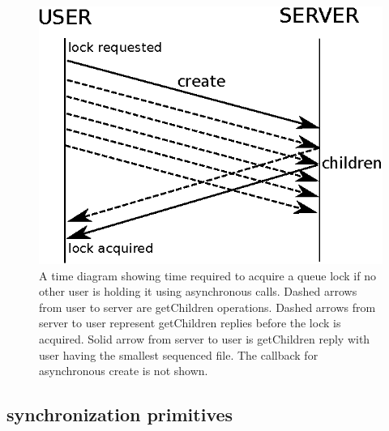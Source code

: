\begin{figure}[h]
\centering
\includegraphics[scale=0.85]{img/async_queue_lock_time.eps}
\caption{A time diagram showing time required to acquire a queue lock if no other user is holding it using asynchronous calls. Dashed arrows from user to server are getChildren operations. Dashed arrows from server to user represent getChildren replies before the lock is acquired. Solid arrow from server to user is getChildren reply with user having the smallest sequenced file. The callback for asynchronous create is not shown.}
\label{fig:async_queue_lock_time}
\end{figure}

\subsection{synchronization primitives}

